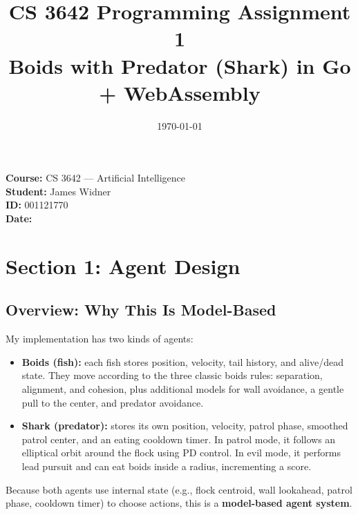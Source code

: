 \documentclass[11pt]{article}
\title{CS 3642 Programming Assignment 1\\
\large Boids with Predator (Shark) in Go + WebAssembly}
\date{}
\begin{document}
\maketitle

\noindent
\textbf{Course:} CS 3642 --- Artificial Intelligence\\
\textbf{Student:} James Widner\\
\textbf{ID:} 001121770\\
\textbf{Date: }\date{\today}

\section*{Section 1: Agent Design}

\subsection*{Overview: Why This Is Model-Based}
My implementation has two kinds of agents:

\begin{itemize}[leftmargin=1.25em]
  \item \textbf{Boids (fish):} each fish stores position, velocity, tail history, and alive/dead state. They move according to the three classic boids rules: separation, alignment, and cohesion, plus additional models for wall avoidance, a gentle pull to the center, and predator avoidance.
  \item \textbf{Shark (predator):} stores its own position, velocity, patrol phase, smoothed patrol center, and an eating cooldown timer. In patrol mode, it follows an elliptical orbit around the flock using PD control. In evil mode, it performs lead pursuit and can eat boids inside a radius, incrementing a score.
\end{itemize}

Because both agents use internal state (e.g., flock centroid, wall lookahead, patrol phase, cooldown timer) to choose actions, this is a \textbf{model-based agent system}.
\end{document}
